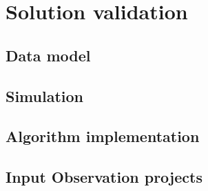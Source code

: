 \chapter{Solution validation}

\section {Data model}

\section {Simulation}

\section {Algorithm implementation}

\section {Input Observation projects}